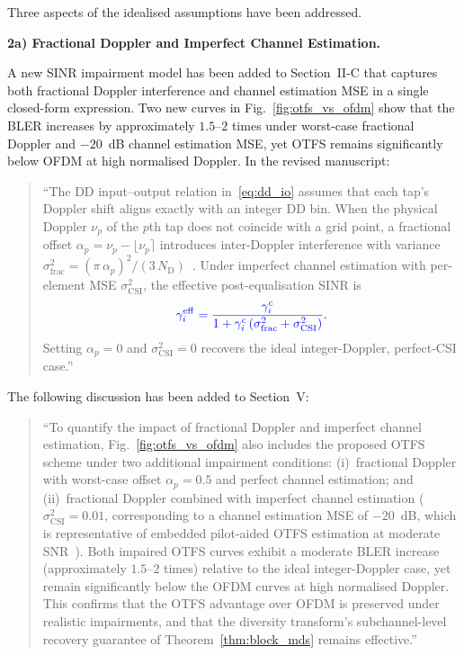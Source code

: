 Three aspects of the idealised assumptions have been addressed.

\vskip 0.1in
\noindent\textbf{2a) Fractional Doppler and Imperfect Channel Estimation.}

A new SINR impairment model has been added to Section~II-C that captures both fractional Doppler interference and channel estimation MSE in a single closed-form expression. Two new curves in Fig.~\ref{fig:otfs_vs_ofdm} show that the BLER increases by approximately $1.5$--$2$ times under worst-case fractional Doppler and $-20$~dB channel estimation MSE, yet OTFS remains significantly below OFDM at high normalised Doppler. In the revised manuscript:

\begin{quote}
``{\color{blue}The DD input--output relation in~\eqref{eq:dd_io} assumes
that each tap's Doppler shift aligns exactly with an integer DD bin.
When the physical Doppler $\nu_p$ of the $p$th tap does not coincide
with a grid point, a fractional offset
$\alpha_p = \nu_p - \lfloor\nu_p\rceil$ introduces inter-Doppler
interference with variance
$\sigma_{\mathrm{frac}}^2 = (\pi\,\alpha_p)^2/(3\,N_{\mathrm{D}})$~\cite{Raviteja2018,Moose1994}.
Under imperfect channel estimation with per-element MSE
$\sigma_{\mathrm{CSI}}^2$, the effective post-equalisation SINR is}
\begin{equation*}
\color{blue}
\gamma_i^{\mathrm{eff}} =
\frac{\gamma_i^{\mathrm{c}}}
{1 + \gamma_i^{\mathrm{c}}
\left(\sigma_{\mathrm{frac}}^2
+ \sigma_{\mathrm{CSI}}^2\right)}.
\end{equation*}
{\color{blue}Setting $\alpha_p = 0$ and $\sigma_{\mathrm{CSI}}^2 = 0$
recovers the ideal integer-Doppler, perfect-CSI case.}''
\end{quote}

The following discussion has been added to Section~V:

\begin{quote}
``{\color{blue}To quantify the impact of fractional Doppler and imperfect
channel estimation, Fig.~\ref{fig:otfs_vs_ofdm} also includes the
proposed OTFS scheme under two additional impairment conditions:
(i)~fractional Doppler with worst-case offset $\alpha_p = 0.5$ and perfect channel estimation; and
(ii)~fractional Doppler combined with imperfect channel estimation
($\sigma_{\mathrm{CSI}}^2 = 0.01$, corresponding to a channel estimation MSE of $-20$~dB, which is representative of embedded pilot-aided OTFS estimation at moderate SNR~\cite{Raviteja2018}).
Both impaired OTFS curves exhibit a moderate BLER increase (approximately
$1.5$--$2$ times) relative to the ideal integer-Doppler case, yet
remain significantly below the OFDM curves at high normalised Doppler.
This confirms that the OTFS advantage over OFDM is preserved under
realistic impairments, and that the diversity transform's
subchannel-level recovery guarantee of Theorem~\ref{thm:block_mds}
remains effective.}''
\end{quote}

